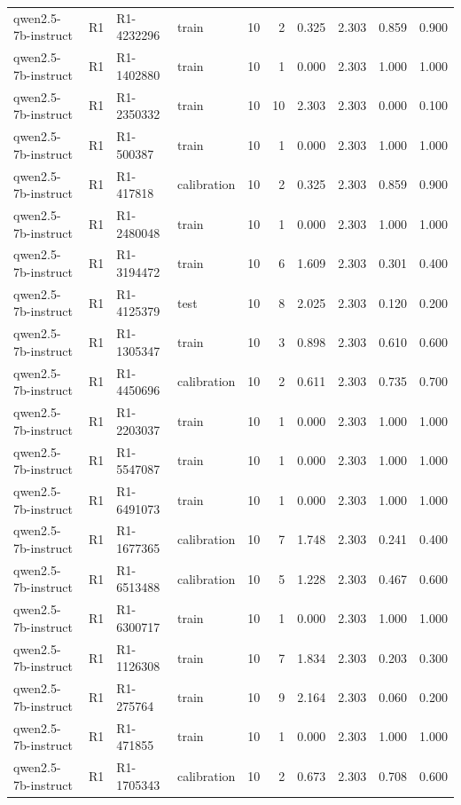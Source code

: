 \begin{table}
\begin{tabular}{llllrrrrrr}
qwen2.5-7b-instruct & R1 & R1-4232296 & train & 10 & 2 & 0.325 & 2.303 & 0.859 & 0.900 \\
qwen2.5-7b-instruct & R1 & R1-1402880 & train & 10 & 1 & 0.000 & 2.303 & 1.000 & 1.000 \\
qwen2.5-7b-instruct & R1 & R1-2350332 & train & 10 & 10 & 2.303 & 2.303 & 0.000 & 0.100 \\
qwen2.5-7b-instruct & R1 & R1-500387 & train & 10 & 1 & 0.000 & 2.303 & 1.000 & 1.000 \\
qwen2.5-7b-instruct & R1 & R1-417818 & calibration & 10 & 2 & 0.325 & 2.303 & 0.859 & 0.900 \\
qwen2.5-7b-instruct & R1 & R1-2480048 & train & 10 & 1 & 0.000 & 2.303 & 1.000 & 1.000 \\
qwen2.5-7b-instruct & R1 & R1-3194472 & train & 10 & 6 & 1.609 & 2.303 & 0.301 & 0.400 \\
qwen2.5-7b-instruct & R1 & R1-4125379 & test & 10 & 8 & 2.025 & 2.303 & 0.120 & 0.200 \\
qwen2.5-7b-instruct & R1 & R1-1305347 & train & 10 & 3 & 0.898 & 2.303 & 0.610 & 0.600 \\
qwen2.5-7b-instruct & R1 & R1-4450696 & calibration & 10 & 2 & 0.611 & 2.303 & 0.735 & 0.700 \\
qwen2.5-7b-instruct & R1 & R1-2203037 & train & 10 & 1 & 0.000 & 2.303 & 1.000 & 1.000 \\
qwen2.5-7b-instruct & R1 & R1-5547087 & train & 10 & 1 & 0.000 & 2.303 & 1.000 & 1.000 \\
qwen2.5-7b-instruct & R1 & R1-6491073 & train & 10 & 1 & 0.000 & 2.303 & 1.000 & 1.000 \\
qwen2.5-7b-instruct & R1 & R1-1677365 & calibration & 10 & 7 & 1.748 & 2.303 & 0.241 & 0.400 \\
qwen2.5-7b-instruct & R1 & R1-6513488 & calibration & 10 & 5 & 1.228 & 2.303 & 0.467 & 0.600 \\
qwen2.5-7b-instruct & R1 & R1-6300717 & train & 10 & 1 & 0.000 & 2.303 & 1.000 & 1.000 \\
qwen2.5-7b-instruct & R1 & R1-1126308 & train & 10 & 7 & 1.834 & 2.303 & 0.203 & 0.300 \\
qwen2.5-7b-instruct & R1 & R1-275764 & train & 10 & 9 & 2.164 & 2.303 & 0.060 & 0.200 \\
qwen2.5-7b-instruct & R1 & R1-471855 & train & 10 & 1 & 0.000 & 2.303 & 1.000 & 1.000 \\
qwen2.5-7b-instruct & R1 & R1-1705343 & calibration & 10 & 2 & 0.673 & 2.303 & 0.708 & 0.600 \\

\end{tabular}
\end{table}
